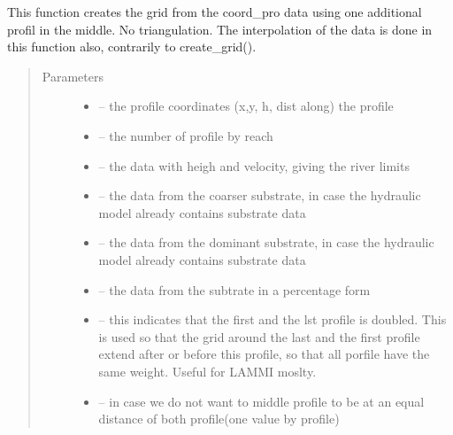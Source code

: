 \documentclass[letterpaper,10pt,english]{sphinxmanual}
\begin{document}
\begin{fulllineitems}
\label{\detokenize{index:src.manage_grid_8.create_grid_only_1_profile}}
This function creates the grid from the coord\_pro data using one additional profil in the middle. No triangulation.
The interpolation of the data is done in this function also, contrarily to create\_grid().
\begin{quote}\begin{description}
\item[{Parameters}] \leavevmode\begin{itemize}
\item {} 
 -- the profile coordinates (x,y, h, dist along) the profile

\item {} 
 -- the number of profile by reach

\item {} 
 -- the data with heigh and velocity, giving the river limits

\item {} 
 -- the data from the coarser substrate, in case the hydraulic model already contains substrate data

\item {} 
 -- the data from the dominant substrate, in case the hydraulic model already contains substrate data

\item {} 
 -- the data from the subtrate in a percentage form

\item {} 
 -- this indicates that the first and the lst profile is doubled. This is used so that the
grid around the last and the first profile extend after or before this profile, so that all porfile have
the same weight. Useful for LAMMI moslty.

\item {} 
 -- in case we do not want to middle profile to be at an equal distance of both profile(one value by profile)


\end{itemize}
\end{description}
\end{quote}
\end{fulllineitems}
\end{document}
